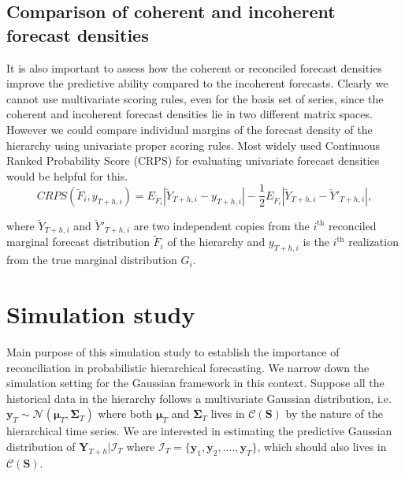 \documentclass[a4paper, 11pt]{article}
\begin{document}
\subsection{Comparison of coherent and incoherent forecast densities}

It is also important to assess how the coherent or reconciled forecast densities improve the predictive ability compared to the incoherent forecasts. Clearly we cannot use multivariate scoring rules, even for the basis set of series, since the coherent and incoherent forecast densities lie in two different matrix spaces.\\

\noindent
However we could compare individual margins of the forecast density of the hierarchy using univariate proper scoring rules. Most widely used Continuous Ranked Probability Score (CRPS) for evaluating univariate forecast densities would be helpful for this. \\

\begin{equation} \label{eq:(3.6)}
CRPS(\breve{F}_i,y_{T+h,i}) = E_{\breve{F}_i}|\breve{Y}_{T+h,i}-y_{T+h,i}| - \frac{1}{2}E_{\breve{F}_i}|\breve{Y}_{T+h,i}-\breve{Y}'_{T+h,i}|,
\end{equation}
       
\noindent
where $\breve{Y}_{T+h,i}$ and $\breve{Y}'_{T+h,i}$ are two independent copies from the $i^{\text{th}}$ reconciled marginal forecast distribution $\tilde{F}_i$ of the hierarchy and $y_{T+h,i}$ is the $i^{\text{th}}$ realization from the true marginal distribution $G_i$. 
 



\section{Simulation study}
Main purpose of this simulation study to establish the importance of reconciliation in probabilistic hierarchical forecasting. We narrow down the simulation setting for the Gaussian framework in this context. Suppose all the historical data in the hierarchy follows a multivariate Gaussian distribution, i.e. $\bm{y}_T \sim \mathscr{N}(\bm{\mu}_T, \bm{\Sigma}_T)$ where both $\bm{\mu}_T$ and $\bm{\Sigma}_T$ lives in $\mathscr{C}(\bm{S})$ by the nature of the hierarchical time series. We are interested in estimating the predictive Gaussian distribution of $\bm{Y}_{T+h}| \bm{\mathcal{I}}_T$ where $\bm{\mathcal{I}}_T= \{\bm{y}_1,\bm{y}_2,....,\bm{y}_T\}$, which should also lives in $\mathscr{C}(\bm{S})$. \\
\end{document}
